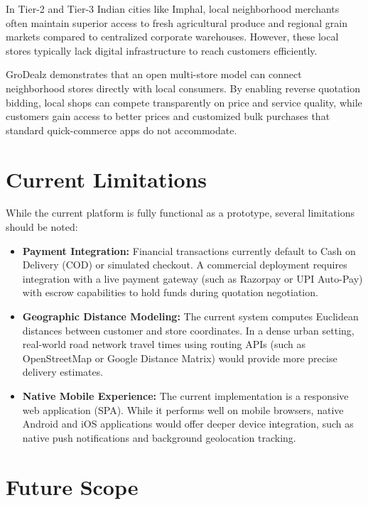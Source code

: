 In Tier-2 and Tier-3 Indian cities like Imphal, local neighborhood merchants often maintain superior access to fresh agricultural produce and regional grain markets compared to centralized corporate warehouses. However, these local stores typically lack digital infrastructure to reach customers efficiently.

GroDealz demonstrates that an open multi-store model can connect neighborhood stores directly with local consumers. By enabling reverse quotation bidding, local shops can compete transparently on price and service quality, while customers gain access to better prices and customized bulk purchases that standard quick-commerce apps do not accommodate.

\section{Current Limitations}

While the current platform is fully functional as a prototype, several limitations should be noted:
\begin{itemize}
    \item \textbf{Payment Integration:} Financial transactions currently default to Cash on Delivery (COD) or simulated checkout. A commercial deployment requires integration with a live payment gateway (such as Razorpay or UPI Auto-Pay) with escrow capabilities to hold funds during quotation negotiation.
    \item \textbf{Geographic Distance Modeling:} The current system computes Euclidean distances between customer and store coordinates. In a dense urban setting, real-world road network travel times using routing APIs (such as OpenStreetMap or Google Distance Matrix) would provide more precise delivery estimates.
    \item \textbf{Native Mobile Experience:} The current implementation is a responsive web application (SPA). While it performs well on mobile browsers, native Android and iOS applications would offer deeper device integration, such as native push notifications and background geolocation tracking.
\end{itemize}

\section{Future Scope}

